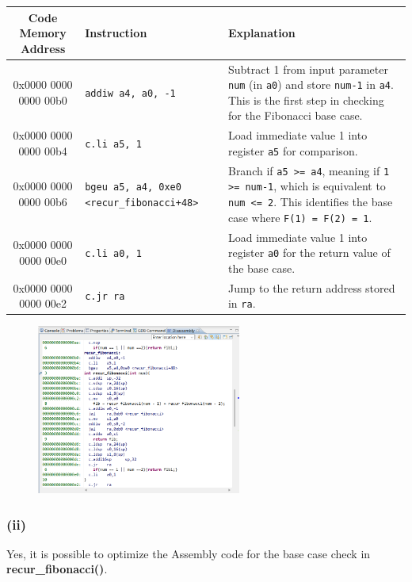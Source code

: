 \documentclass[12pt]{article}
\begin{document}
\begin{table}[H]
    \centering
    \begin{tabular}{|c|p{4.5cm}|p{6.5cm}|}
    \hline
    \textbf{Code Memory Address} & \textbf{Instruction} & \textbf{Explanation} \\
    \hline
    0x0000 0000 0000 00b0 & \texttt{addiw a4, a0, -1} & Subtract 1 from input parameter \texttt{num} (in \texttt{a0}) and store \texttt{num-1} in \texttt{a4}. This is the first step in checking for the Fibonacci base case. \\
    \hline
    0x0000 0000 0000 00b4 & \texttt{c.li a5, 1} & Load immediate value 1 into register \texttt{a5} for comparison. \\
    \hline
    0x0000 0000 0000 00b6 & \texttt{bgeu a5, a4, 0xe0 <recur\_fibonacci+48>} & Branch if \texttt{a5 >= a4}, meaning if \texttt{1 >= num-1}, which is equivalent to \texttt{num <= 2}. This identifies the base case where \texttt{F(1) = F(2) = 1}. \\
    \hline
    0x0000 0000 0000 00e0 & \texttt{c.li a0, 1} & Load immediate value 1 into register \texttt{a0} for the return value of the base case. \\
    \hline
    0x0000 0000 0000 00e2 & \texttt{c.jr ra} & Jump to the return address stored in \texttt{ra}. \\
    \hline
    \end{tabular}
\end{table}

\begin{figure}[H]
    \centering
    \includegraphics[width=0.6\textwidth]{img/base_case.png}
\end{figure}

\subsubsection*{(ii)}
Yes, it is possible to optimize the Assembly code for the base case check in \textbf{recur\_fibonacci()}.
\end{document}
